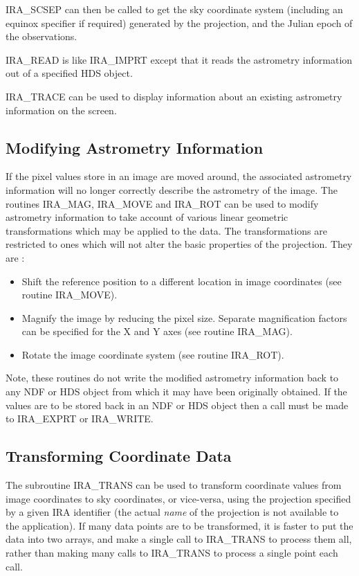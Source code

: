 IRA\_SCSEP can then be called to get the sky coordinate system (including an
equinox specifier if required) generated by the projection, and the Julian epoch
of the observations.

IRA\_READ is like IRA\_IMPRT except that it reads the astrometry information
out of a specified HDS object.

IRA\_TRACE can be used to display information about an existing astrometry
information on the screen.

\subsection {Modifying Astrometry Information}
If the pixel values store in an image are moved around, the associated
astrometry information will no longer correctly describe the astrometry of the
image. The routines IRA\_MAG, IRA\_MOVE and IRA\_ROT can be used to modify
astrometry information to take account of various linear geometric
transformations which may be applied to the data. The transformations are
restricted to ones which will not alter the basic properties of the projection.
They are :

\begin{itemize}
\item Shift the reference position to a different location in image coordinates
(see routine IRA\_MOVE).
\item Magnify the image by reducing the pixel size. Separate magnification
factors can be specified for the X and Y axes (see routine IRA\_MAG).
\item Rotate the image coordinate system (see routine IRA\_ROT).
\end{itemize}

Note, these routines do not write the modified astrometry information back to
any NDF or HDS object from which it may have been originally obtained. If the
values are to be stored back in an NDF or HDS object then a call must be made to
IRA\_EXPRT or IRA\_WRITE.

\subsection {Transforming Coordinate Data}
The subroutine IRA\_TRANS can be used to transform coordinate values from image
coordinates to sky coordinates, or vice-versa, using the projection specified by
a given IRA identifier (the actual {\em name} of the projection is not
available to the application). If many data points are to be transformed, it is
faster to put the data into two arrays, and make a single call to IRA\_TRANS to
process them all, rather than making many calls to IRA\_TRANS to process a
single point each call.

